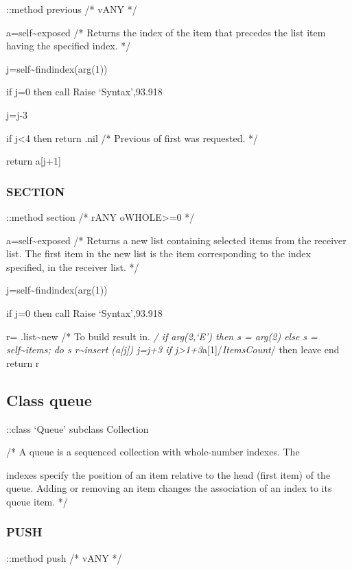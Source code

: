 ::method previous /* vANY */

a=self\textasciitilde exposed /* Returns the index of the item that
precedes the list item having the specified index. */

j=self\textasciitilde findindex(arg(1))

if j=0 then call Raise `Syntax',93.918

j=j-3

if j\textless4 then return .nil /* Previous of first was requested. */

return a{[}j+1{]}

\hypertarget{section-2}{%
\subsubsection{SECTION}\label{section-2}}

::method section /* rANY oWHOLE\textgreater=0 */

a=self\textasciitilde exposed /* Returns a new list containing selected
items from the receiver list. The first item in the new list is the item
corresponding to the index specified, in the receiver list. */

j=self\textasciitilde findindex(arg(1))

if j=0 then call Raise `Syntax',93.918

r= .list\textasciitilde new /* To build result in. \emph{/ if arg(2,`E')
then s = arg(2) else s = self\textasciitilde items; do s
r\textasciitilde insert (a{[}j{]}) j=j+3 if
j\textgreater1+3}a{[}1{]}/\emph{ItemsCount}/ then leave end return r

\hypertarget{class-queue}{%
\subsection{Class queue}\label{class-queue}}

::class `Queue' subclass Collection

/* A queue is a sequenced collection with whole-number indexes. The

indexes specify the position of an item relative to the head (first
item) of the queue. Adding or removing an item changes the association
of an index to its queue item. */

\hypertarget{push}{%
\subsubsection{PUSH}\label{push}}

::method push /* vANY */

